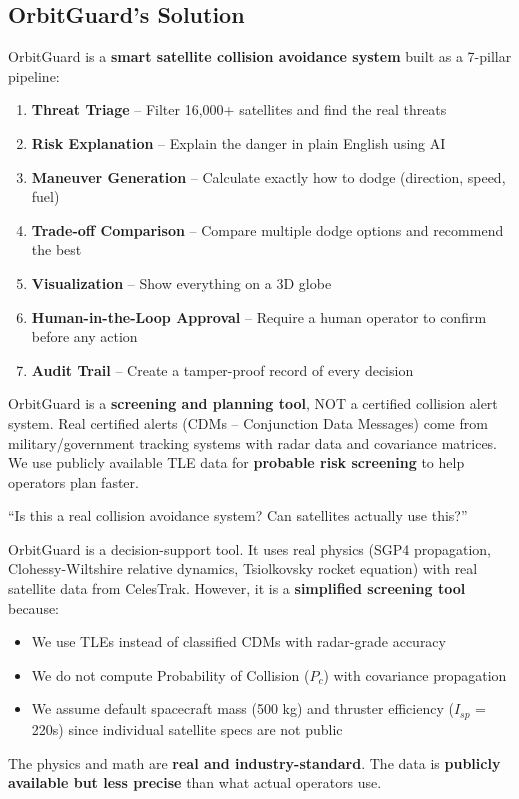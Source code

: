 \documentclass[12pt,a4paper]{article}
\begin{document}
\subsection{OrbitGuard's Solution}
OrbitGuard is a \textbf{smart satellite collision avoidance system} built as a 7-pillar pipeline:
\begin{enumerate}
    \item \textbf{Threat Triage} -- Filter 16,000+ satellites and find the real threats
    \item \textbf{Risk Explanation} -- Explain the danger in plain English using AI
    \item \textbf{Maneuver Generation} -- Calculate exactly how to dodge (direction, speed, fuel)
    \item \textbf{Trade-off Comparison} -- Compare multiple dodge options and recommend the best
    \item \textbf{Visualization} -- Show everything on a 3D globe
    \item \textbf{Human-in-the-Loop Approval} -- Require a human operator to confirm before any action
    \item \textbf{Audit Trail} -- Create a tamper-proof record of every decision
\end{enumerate}

\begin{warningbox}
OrbitGuard is a \textbf{screening and planning tool}, NOT a certified collision alert system. Real certified alerts (CDMs -- Conjunction Data Messages) come from military/government tracking systems with radar data and covariance matrices. We use publicly available TLE data for \textbf{probable risk screening} to help operators plan faster.
\end{warningbox}

\begin{questionbox}
``Is this a real collision avoidance system? Can satellites actually use this?''
\end{questionbox}
\begin{answerbox}
OrbitGuard is a decision-support tool. It uses real physics (SGP4 propagation, Clohessy-Wiltshire relative dynamics, Tsiolkovsky rocket equation) with real satellite data from CelesTrak. However, it is a \textbf{simplified screening tool} because:
\begin{itemize}
    \item We use TLEs instead of classified CDMs with radar-grade accuracy
    \item We do not compute Probability of Collision ($P_c$) with covariance propagation
    \item We assume default spacecraft mass (500 kg) and thruster efficiency ($I_{sp}$ = 220s) since individual satellite specs are not public
\end{itemize}
The physics and math are \textbf{real and industry-standard}. The data is \textbf{publicly available but less precise} than what actual operators use.
\end{answerbox}
\end{document}
